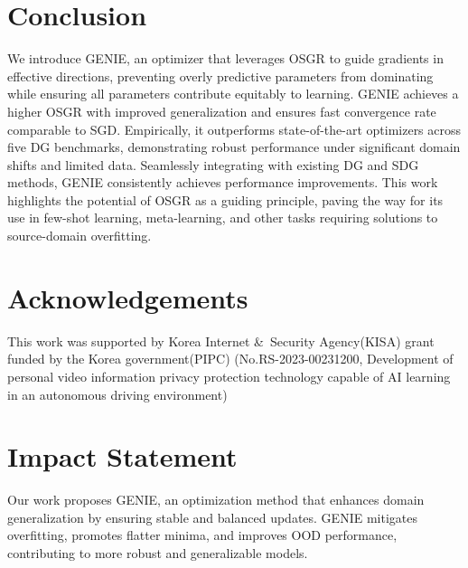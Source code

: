 \documentclass{article}
\theoremstyle{plain}
\theoremstyle{definition}
\theoremstyle{remark}
\begin{document}
\section{Conclusion}
We introduce GENIE, an optimizer that leverages OSGR to guide gradients in effective directions, preventing overly predictive parameters from dominating while ensuring all parameters contribute equitably to learning. GENIE achieves a higher OSGR with improved generalization and ensures fast convergence rate comparable to SGD. Empirically, it outperforms state-of-the-art optimizers across five DG benchmarks, demonstrating robust performance under significant domain shifts and limited data. Seamlessly integrating with existing DG and SDG methods, GENIE consistently achieves performance improvements. This work highlights the potential of OSGR as a guiding principle, paving the way for its use in few-shot learning, meta-learning, and other tasks requiring solutions to source-domain overfitting. 

\section*{Acknowledgements}
This work was supported by Korea Internet \&\ Security Agency(KISA) grant funded by the Korea government(PIPC) (No.RS-2023-00231200, Development of personal video information privacy protection technology capable of AI learning in an autonomous driving environment) 

\section*{Impact Statement}
Our work proposes GENIE, an optimization method that enhances domain generalization by ensuring stable and balanced updates. GENIE mitigates overfitting, promotes flatter minima, and improves OOD performance, contributing to more robust and generalizable models.



\newpage
\appendix
\onecolumn
\end{document}
